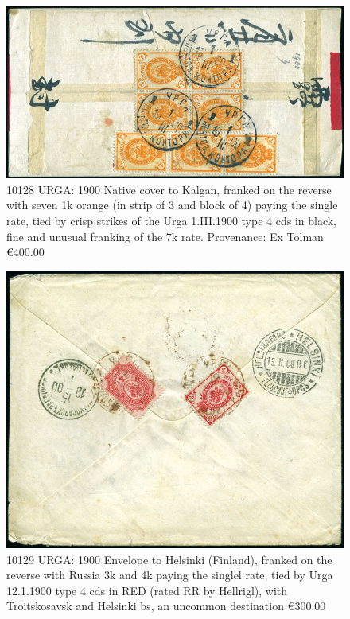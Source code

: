 \begin{figure}[htbp]
\centering
\includegraphics[width=.95\textwidth]{../russian-post-in-mongolia/10128.jpg}
\caption{ 
10128 URGA: 1900 Native cover to Kalgan, franked on the reverse with 
seven 1k orange (in strip of 3 and block of 4) paying the single rate, 
tied by crisp strikes of the Urga 1.III.1900 type 4 cds in black, fine and 
unusual franking of the 7k rate.
Provenance: Ex Tolman
\euro 400.00 
} 
\end{figure}    

\begin{figure}[htbp]
\centering
\includegraphics[width=.95\textwidth]{../russian-post-in-mongolia/10129.jpg}
\caption{ 
10129 URGA: 1900 Envelope to Helsinki (Finland), franked on the reverse with 
Russia 3k and 4k paying the singlel rate, tied by Urga 12.1.1900 type 4 cds 
in RED (rated RR by Hellrigl), with Troitskosavsk and Helsinki bs, an 
uncommon destination
\euro 300.00 
} 
\end{figure}   

